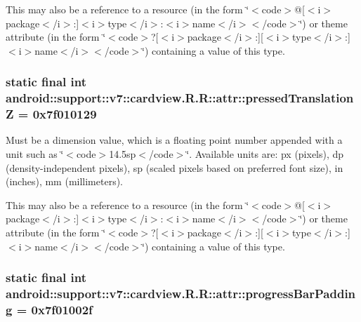 This may also be a reference to a resource (in the form \char`\"{}$<$code$>$@\mbox{[}$<$i$>$package$<$/i$>$:\mbox{]}$<$i$>$type$<$/i$>$:$<$i$>$name$<$/i$>$$<$/code$>$\char`\"{}) or theme attribute (in the form \char`\"{}$<$code$>$?\mbox{[}$<$i$>$package$<$/i$>$:\mbox{]}\mbox{[}$<$i$>$type$<$/i$>$:\mbox{]}$<$i$>$name$<$/i$>$$<$/code$>$\char`\"{}) containing a value of this type. \hypertarget{classandroid_1_1support_1_1v7_1_1cardview_1_1_r_1_1attr_02472b4da96c2c4e30ffb624460f0956}{
\subsubsection[{pressedTranslationZ}]{\setlength{\rightskip}{0pt plus 5cm}static final int android::support::v7::cardview.R.R::attr::pressedTranslationZ = 0x7f010129}}
\label{classandroid_1_1support_1_1v7_1_1cardview_1_1_r_1_1attr_02472b4da96c2c4e30ffb624460f0956}


Must be a dimension value, which is a floating point number appended with a unit such as \char`\"{}$<$code$>$14.5sp$<$/code$>$\char`\"{}. Available units are: px (pixels), dp (density-independent pixels), sp (scaled pixels based on preferred font size), in (inches), mm (millimeters). 

This may also be a reference to a resource (in the form \char`\"{}$<$code$>$@\mbox{[}$<$i$>$package$<$/i$>$:\mbox{]}$<$i$>$type$<$/i$>$:$<$i$>$name$<$/i$>$$<$/code$>$\char`\"{}) or theme attribute (in the form \char`\"{}$<$code$>$?\mbox{[}$<$i$>$package$<$/i$>$:\mbox{]}\mbox{[}$<$i$>$type$<$/i$>$:\mbox{]}$<$i$>$name$<$/i$>$$<$/code$>$\char`\"{}) containing a value of this type. \hypertarget{classandroid_1_1support_1_1v7_1_1cardview_1_1_r_1_1attr_4bacd53e9d1e3326558372ef604e4e52}{
\subsubsection[{progressBarPadding}]{\setlength{\rightskip}{0pt plus 5cm}static final int android::support::v7::cardview.R.R::attr::progressBarPadding = 0x7f01002f}}
\label{classandroid_1_1support_1_1v7_1_1cardview_1_1_r_1_1attr_4bacd53e9d1e3326558372ef604e4e52}


